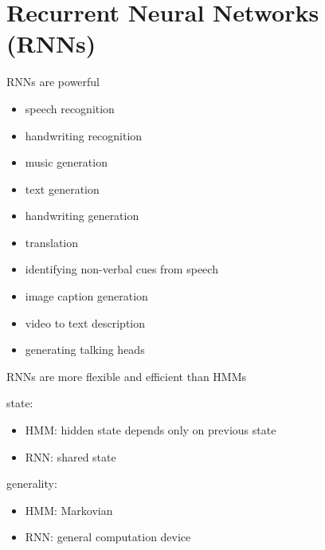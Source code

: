 \documentclass{beamer}
\begin{document}
  \section{Recurrent Neural Networks (RNNs)}

  
  \begin{frame}{RNNs are powerful}
    
    \begin{itemize}

    \item speech recognition
    \item handwriting recognition
    \item music generation
    \item text generation
    \item handwriting generation
    \item translation
    \item identifying non-verbal cues from speech
    \item image caption generation
    \item video to text description
    \item generating talking heads

    \end{itemize}
        
  \end{frame}


  \begin{frame}{RNNs are more flexible and efficient than HMMs}
    
    state:
    \begin{itemize}
    \item HMM: hidden state depends only on previous state
    \item RNN: shared state
    \end{itemize}

    generality:
    \begin{itemize}
    \item HMM: Markovian
    \item RNN: general computation device
    \end{itemize}
    
  \end{frame}
\end{document}
